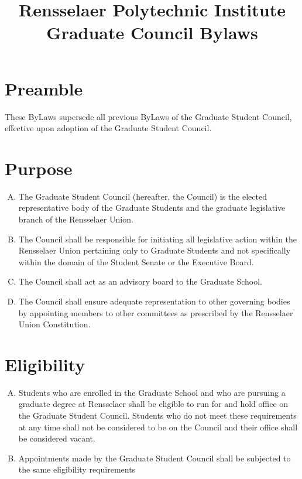 \documentclass[letterpaper,12pt]{article}
\title{Rensselaer Polytechnic Institute Graduate Council Bylaws}
\date{ }
\begin{document}
\begin{titlepage}
	\maketitle
	\thispagestyle{empty}
\end{titlepage}

\newpage %
\tableofcontents
\thispagestyle{empty}
\newpage
\clearpage
{}

\section{Preamble}
\noindent These ByLaws supersede all previous ByLaws of the Graduate Student Council, effective upon adoption of the Graduate Student Council.

\section{Purpose}
\begin{enumerate}[A.]
	\item The Graduate Student Council (hereafter, the Council) is the elected representative body of the Graduate Students and the graduate legislative branch of the Rensselaer Union.
	\item The Council shall be responsible for initiating all legislative action within the Rensselaer Union pertaining only to Graduate Students and not specifically within the domain of the Student Senate or the Executive Board.
	\item The Council shall act as an advisory board to the Graduate School.
	\item The Council shall ensure adequate representation to other governing bodies by appointing members to other committees as prescribed by the Rensselaer Union Constitution.
\end{enumerate}

\section{Eligibility}
\begin{enumerate}[A.]
	\item Students who are enrolled in the Graduate School and who are pursuing a graduate degree at Rensselaer shall be eligible to run for and hold office on the Graduate Student Council. Students who do not meet these requirements at any time shall not be considered to be on the Council and their office shall be considered vacant.
	\item Appointments made by the Graduate Student Council shall be subjected to the same eligibility requirements
\end{enumerate}
\end{document}
